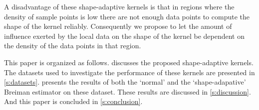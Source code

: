 A disadvantage of these shape-adaptive kernels is that in regions where the density of sample points is low there are not enough data points to compute the shape of the kernel reliably. Consequently we propose to let the amount of influence exerted by the local data on the shape of the kernel be dependent on the density of the data points in that region.

This paper is organized as follows.  discusses the proposed shape-adaptive kernels. The datasets used to investigate the performance of these kernels are presented in \cref{s:datasets}.  presents the results of both the `normal' and the `shape-adapative' Breiman estimator on these dataset. These results are discussed in \cref{s:discussion}. And this paper is concluded in \cref{s:conclusion}.